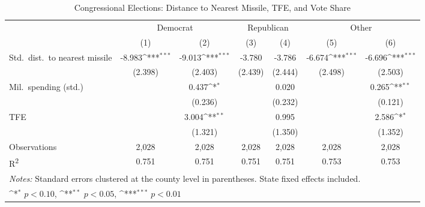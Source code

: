 \begin{table}[htbp]\centering
\setlength{\tabcolsep}{5pt}
\small
\def\sym#1{\ifmmode^{#1}\else\(^{#1}\)\fi}
\caption{Congressional Elections: Distance to Nearest Missile, TFE, and Vote Share}
\begin{tabular}{l*{6}{c}}
\toprule
                    &\multicolumn{2}{c}{Democrat}&\multicolumn{2}{c}{Republican}&\multicolumn{2}{c}{Other}\\
\cmidrule(lr){2-3}\cmidrule(lr){4-5}\cmidrule(lr){6-7}
                    &\multicolumn{1}{c}{(1)}&\multicolumn{1}{c}{(2)}&\multicolumn{1}{c}{(3)}&\multicolumn{1}{c}{(4)}&\multicolumn{1}{c}{(5)}&\multicolumn{1}{c}{(6)}\\
\midrule
Std.\ dist.\ to nearest missile
                    &      -8.983\sym{***}&      -9.013\sym{***}&      -3.780         &      -3.786         &      -6.674\sym{***}&      -6.696\sym{***}\\
                    &     (2.398)         &     (2.403)         &     (2.439)         &     (2.444)         &     (2.498)         &     (2.503)         \\
Mil.\ spending (std.)
                    &                     &       0.437\sym{*}  &                     &       0.020         &                     &       0.265\sym{**} \\
                    &                     &     (0.236)         &                     &     (0.232)         &                     &     (0.121)         \\
TFE                 &                     &       3.004\sym{**} &                     &       0.995         &                     &       2.586\sym{*}  \\
                    &                     &     (1.321)         &                     &     (1.350)         &                     &     (1.352)         \\
\midrule
Observations        &       2,028         &       2,028         &       2,028         &       2,028         &       2,028         &       2,028         \\
R\textsuperscript{2}&       0.751         &       0.751         &       0.751         &       0.751         &       0.753         &       0.753         \\
\bottomrule
\multicolumn{7}{l}{\footnotesize \textit{Notes:} Standard errors clustered at the county level in parentheses. State fixed effects included.}\\
\multicolumn{7}{l}{\footnotesize \sym{*} \(p<0.10\), \sym{**} \(p<0.05\), \sym{***} \(p<0.01\)}\\
\end{tabular}
\end{table}
